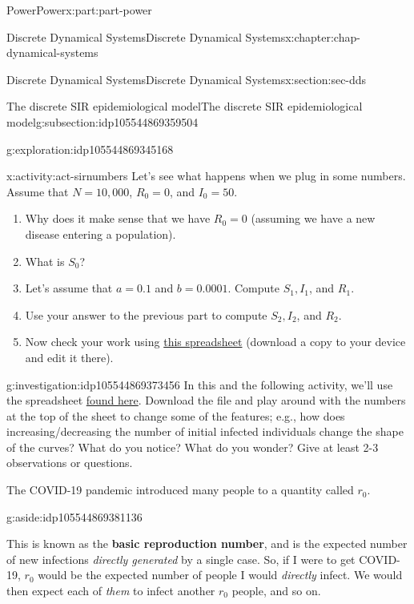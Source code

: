 \documentclass[oneside,10pt,]{book}
\newcommand{\terminology}[1]{\textbf{#1}}
\numberwithin{equation}{section}
\begin{document}
\begin{partptx}{Power}{}{Power}{}{}{x:part:part-power}
\begin{chapterptx}{Discrete Dynamical Systems}{}{Discrete Dynamical Systems}{}{}{x:chapter:chap-dynamical-systems}
\begin{sectionptx}{Discrete Dynamical Systems}{}{Discrete Dynamical Systems}{}{}{x:section:sec-dds}
\begin{subsectionptx}{The discrete SIR epidemiological model}{}{The discrete SIR epidemiological model}{}{}{g:subsection:idp105544869359504}
\begin{exploration}{}{g:exploration:idp105544869345168}
\begin{enumerate}
\end{enumerate}
\end{exploration}%
\begin{activity}{}{x:activity:act-sirnumbers}%
Let's see what happens when we plug in some numbers. Assume that \(N = 10,000\), \(R_0 = 0\), and \(I_0 = 50\).%
%
\begin{enumerate}
\item{}Why does it make sense that we have \(R_0 = 0\) (assuming we have a new disease entering a population).%
\item{}What is \(S_0\)?%
\item{}Let's assume that \(a = 0.1\) and \(b = 0.0001\). Compute \(S_1, I_1\), and \(R_1\).%
\item{}Use your answer to the previous part to compute \(S_2, I_2\), and \(R_2\).%
\item{}Now check your work using \href{https://docs.google.com/spreadsheets/d/153LO2O21_TwEYyODq2Km90oRrilLEpfYmgb8w3AJSQo/edit?usp=sharing}{this spreadsheet}\footnotemark{} (download a copy to your device and edit it there).%
\end{enumerate}
\end{activity}%
%
\begin{investigation}{}{g:investigation:idp105544869373456}%
In this and the following activity, we'll use the spreadsheet \href{https://docs.google.com/spreadsheets/d/153LO2O21_TwEYyODq2Km90oRrilLEpfYmgb8w3AJSQo/edit?usp=sharing}{found here}\footnotemark{}. Download the file and play around with the numbers at the top of the sheet to change some of the features; e.g., how does increasing\slash{}decreasing the number of initial infected individuals change the shape of the curves? What do you notice? What do you wonder? Give at least 2-3 observations or questions.%
\end{investigation}%
%
The COVID-19 pandemic introduced many people to a quantity called \(r_0\). \begin{aside}{}{g:aside:idp105544869381136}%
\end{aside}
 This is known as the \terminology{basic reproduction number}, and is the expected number of new infections \emph{directly generated} by a single case. So, if I were to get COVID-19, \(r_0\) would be the expected number of people I would \emph{directly} infect. We would then expect each of \emph{them} to infect another \(r_0\) people, and so on.%

\end{subsectionptx}
\end{sectionptx}
\end{chapterptx}
\end{partptx}
\end{document}
